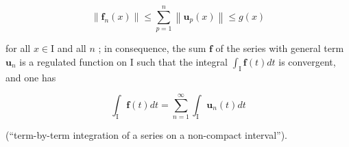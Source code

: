 \[
\left\| \mathbf {f} _ {n} (x) \right\| \leqslant \sum_ {p = 1} ^ {n} \left\| \mathbf {u} _ {p} (x) \right\| \leqslant g (x)
\]

for all \(x \in \mathrm{I}\) and all \(n\) ; in consequence, the sum \(\mathbf{f}\) of the series with general term \(\mathbf{u}_n\) is a regulated function on \(\mathrm{I}\) such that the integral \(\int_{\mathrm{I}} \mathbf{f}(t) dt\) is convergent, and one has

\[
\int_ {\mathrm{I}} \mathbf {f} (t) d t = \sum_ {n = 1} ^ {\infty} \int_ {\mathrm{I}} \mathbf {u} _ {n} (t) d t\tag{11}
\]

(``term-by-term integration of a series on a non-compact interval'').

